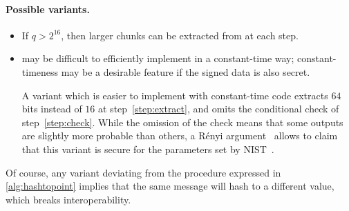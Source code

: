 \paragraph{Possible variants.}
\begin{itemize}

\item If $q > 2^{16}$, then larger chunks can be extracted from \shake
at each step.

\item \hashtopoint may be difficult to efficiently
implement in a constant-time way; constant-timeness may be a desirable
feature if the signed data is also secret.

A variant which is easier to
implement with constant-time code extracts $64$ bits instead of $16$ at
step~\ref{step:extract}, and omits the conditional check of
step~\ref{step:check}. While the omission of the check means that some
outputs are slightly more probable than others, a
Rényi argument~\cite{AC:BLLSS15,AC:Prest17} allows to claim that this variant is
secure for the parameters set by NIST~\cite{NIST}.

\end{itemize}

Of course, any variant deviating from the procedure expressed in
\cref{alg:hashtopoint} implies that the same message will hash
to a different value, which breaks interoperability.

%
%


